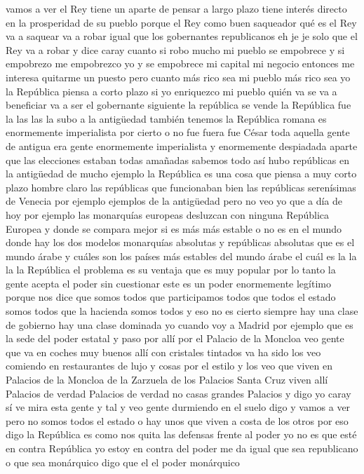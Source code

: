 vamos a ver el Rey tiene un aparte de pensar a largo plazo tiene interés directo en la prosperidad de su pueblo
porque el Rey como buen saqueador qué es el Rey va a saquear va a robar
igual que los gobernantes republicanos eh je je solo que el Rey va a robar y dice caray cuanto
si robo mucho mi pueblo se empobrece y si empobrezo me empobrezco yo y se empobrece
mi capital mi negocio entonces me interesa quitarme un puesto pero cuanto más rico sea mi pueblo más rico sea yo
la República piensa a corto plazo si yo enriquezco mi pueblo quién va se va a beneficiar va a ser el gobernante siguiente
la república se vende la República fue la las las la subo a la antigüedad también tenemos la República romana
es enormemente imperialista por cierto o no fue fuera fue César
toda aquella gente de antigua era gente enormemente imperialista y enormemente despiadada aparte que las elecciones estaban todas amañadas
sabemos todo así hubo repúblicas en la antigüedad de mucho ejemplo la República es una cosa que piensa a muy corto plazo
hombre claro las repúblicas que funcionaban bien las repúblicas serenísimas de Venecia por ejemplo ejemplos de la antigüedad pero no veo yo que a día de hoy por ejemplo
las monarquías europeas desluzcan con ninguna República Europea y donde se compara mejor
si es más más estable o no es en el mundo donde hay los dos modelos monarquías absolutas y repúblicas absolutas
que es el mundo árabe y cuáles son los países más estables del mundo árabe
el cuál es la la la la República el problema es su ventaja
que es muy popular por lo tanto la gente acepta el poder sin cuestionar
este es un poder enormemente legítimo porque nos dice que somos todos que participamos todos que todos el estado somos todos
que la hacienda somos todos y eso no es cierto siempre hay una clase de gobierno hay una clase dominada
yo cuando voy a Madrid por ejemplo que es la sede del poder estatal y paso por allí por el Palacio de la Moncloa
veo gente que va en coches muy buenos allí con cristales tintados va ha sido
los veo comiendo en restaurantes de lujo y cosas por el estilo y los veo que viven en Palacios de la Moncloa de la Zarzuela
de los Palacios Santa Cruz viven allí Palacios de verdad Palacios de verdad no casas grandes Palacios
y digo yo caray sí ve mira esta gente y tal y veo gente durmiendo en el suelo digo y vamos a ver pero no somos todos el estado
o hay unos que viven a costa de los otros
por eso digo la República es como nos quita las defensas frente al poder
yo no es que esté en contra República yo estoy en contra del poder me da igual que sea republicano o que sea monárquico digo que el el poder monárquico
